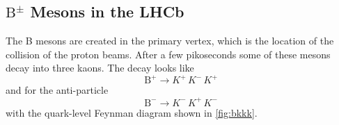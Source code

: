 \subsection{$\text{B}^{\pm}$ Mesons in the LHCb}
\label{sec:decay}
The B mesons are created in the primary vertex, which is the location of the collision of the proton beams. After a few pikoseconds some of these mesons decay into three kaons. The decay looks like
\begin{equation*}
  \text{B}^+ \to K^+ \, K^- \, K^+
\end{equation*}
and for the anti-particle
\begin{equation*}
  \text{B}^- \to K^- \, K^+ \, K^-
\end{equation*}
with the quark-level Feynman diagram shown in \autoref{fig:bkkk}.\\\\
